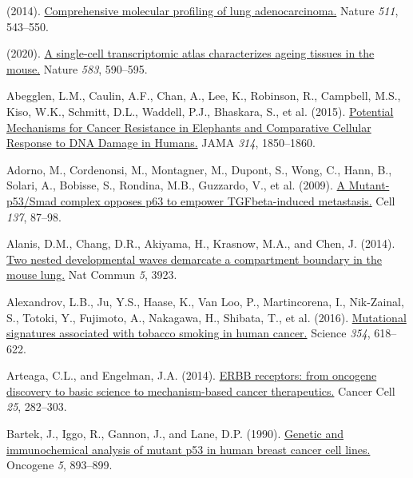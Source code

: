 \hypertarget{refs}{}
\begin{CSLReferences}{0}{0}
\leavevmode{}%
(2014). \href{https://doi.org/10.1038/nature13385}{Comprehensive molecular profiling of lung adenocarcinoma.} Nature \emph{511}, 543--550.

\leavevmode{}%
(2020). \href{https://doi.org/10.1038/s41586-020-2496-1}{A single-cell transcriptomic atlas characterizes ageing tissues in the mouse.} Nature \emph{583}, 590--595.

\leavevmode{}%
Abegglen, L.M., Caulin, A.F., Chan, A., Lee, K., Robinson, R., Campbell, M.S., Kiso, W.K., Schmitt, D.L., Waddell, P.J., Bhaskara, S., et al. (2015). \href{https://doi.org/10.1001/jama.2015.13134}{Potential Mechanisms for Cancer Resistance in Elephants and Comparative Cellular Response to DNA Damage in Humans.} JAMA \emph{314}, 1850--1860.

\leavevmode{}%
Adorno, M., Cordenonsi, M., Montagner, M., Dupont, S., Wong, C., Hann, B., Solari, A., Bobisse, S., Rondina, M.B., Guzzardo, V., et al. (2009). \href{https://doi.org/10.1016/j.cell.2009.01.039}{A Mutant-p53/Smad complex opposes p63 to empower TGFbeta-induced metastasis.} Cell \emph{137}, 87--98.

\leavevmode{}%
Alanis, D.M., Chang, D.R., Akiyama, H., Krasnow, M.A., and Chen, J. (2014). \href{https://doi.org/10.1038/ncomms4923}{Two nested developmental waves demarcate a compartment boundary in the mouse lung.} Nat Commun \emph{5}, 3923.

\leavevmode{}%
Alexandrov, L.B., Ju, Y.S., Haase, K., Van Loo, P., Martincorena, I., Nik-Zainal, S., Totoki, Y., Fujimoto, A., Nakagawa, H., Shibata, T., et al. (2016). \href{https://doi.org/10.1126/science.aag0299}{Mutational signatures associated with tobacco smoking in human cancer.} Science \emph{354}, 618--622.

\leavevmode{}%
Arteaga, C.L., and Engelman, J.A. (2014). \href{https://doi.org/10.1016/j.ccr.2014.02.025}{ERBB receptors: from oncogene discovery to basic science to mechanism-based cancer therapeutics.} Cancer Cell \emph{25}, 282--303.

\leavevmode{}%
Bartek, J., Iggo, R., Gannon, J., and Lane, D.P. (1990). \href{https://www.ncbi.nlm.nih.gov/pubmed/1694291}{Genetic and immunochemical analysis of mutant p53 in human breast cancer cell lines.} Oncogene \emph{5}, 893--899.


\end{CSLReferences}
